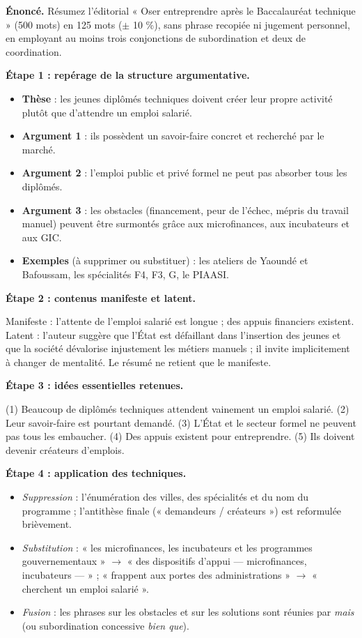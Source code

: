 \documentclass[11pt]{article}
\begin{document}
\begin{exoresolu}
\textbf{Énoncé.} Résumez l'éditorial « Oser entreprendre après le Baccalauréat technique » (500 mots) en 125 mots ($\pm$ 10 \%), sans phrase recopiée ni jugement personnel, en employant au moins trois conjonctions de subordination et deux de coordination.

\tcblower

\textbf{Étape 1 : repérage de la structure argumentative.}

\begin{itemize}
\item \textbf{Thèse} : les jeunes diplômés techniques doivent créer leur propre activité plutôt que d'attendre un emploi salarié.
\item \textbf{Argument 1} : ils possèdent un savoir-faire concret et recherché par le marché.
\item \textbf{Argument 2} : l'emploi public et privé formel ne peut pas absorber tous les diplômés.
\item \textbf{Argument 3} : les obstacles (financement, peur de l'échec, mépris du travail manuel) peuvent être surmontés grâce aux microfinances, aux incubateurs et aux GIC.
\item \textbf{Exemples} (à supprimer ou substituer) : les ateliers de Yaoundé et Bafoussam, les spécialités F4, F3, G, le PIAASI.
\end{itemize}

\textbf{Étape 2 : contenus manifeste et latent.}

Manifeste : l'attente de l'emploi salarié est longue ; des appuis financiers existent. Latent : l'auteur suggère que l'État est défaillant dans l'insertion des jeunes et que la société dévalorise injustement les métiers manuels ; il invite implicitement à changer de mentalité. Le résumé ne retient que le manifeste.

\textbf{Étape 3 : idées essentielles retenues.}

(1) Beaucoup de diplômés techniques attendent vainement un emploi salarié. (2) Leur savoir-faire est pourtant demandé. (3) L'État et le secteur formel ne peuvent pas tous les embaucher. (4) Des appuis existent pour entreprendre. (5) Ils doivent devenir créateurs d'emplois.

\textbf{Étape 4 : application des techniques.}

\begin{itemize}
\item \emph{Suppression} : l'énumération des villes, des spécialités et du nom du programme ; l'antithèse finale (« demandeurs / créateurs ») est reformulée brièvement.
\item \emph{Substitution} : « les microfinances, les incubateurs et les programmes gouvernementaux » $\rightarrow$ « des dispositifs d'appui — microfinances, incubateurs — » ; « frappent aux portes des administrations » $\rightarrow$ « cherchent un emploi salarié ».
\item \emph{Fusion} : les phrases sur les obstacles et sur les solutions sont réunies par \emph{mais} (ou subordination concessive \emph{bien que}).
\end{itemize}


\end{exoresolu}
\end{document}
